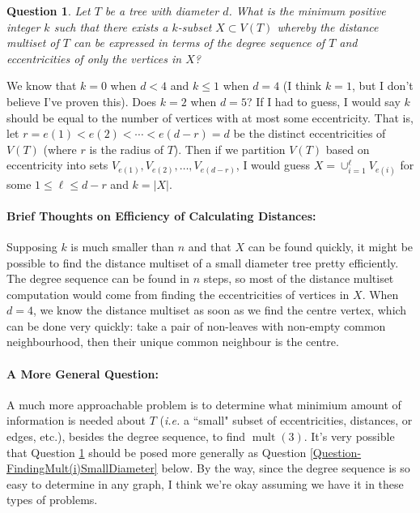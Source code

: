 \documentclass[12]{article}
\DeclareMathOperator{\mult}{mult}
\newtheorem{question}{Question}
\theoremstyle{definition}
\begin{document}
	\begin{question}\label{Question-FindingDistancesSmallDiameter}
		Let $T$ be a tree with diameter $d$.  What is the minimum positive integer $k$ such that there exists a $k$-subset $X \subset V(T)$ whereby the distance multiset of $T$ can be expressed in terms of the degree sequence of $T$ and eccentricities of only the vertices in $X$?
	\end{question}

	We know that $k=0$ when $d < 4$ and $k \leq 1$ when $d=4$ (I think $k=1$, but I don't believe I've proven this).  Does $k = 2$ when $d=5$?  If I had to guess, I would say $k$ should be equal to the number of vertices with at most some eccentricity.  That is, let $r=e(1) < e(2) < \cdots < e(d-r) = d$ be the distinct eccentricities of $V(T)$ (where $r$ is the radius of $T$).  Then if we partition $V(T)$ based on eccentricity into sets $V_{e(1)}, V_{e(2)}, \ldots, V_{e(d-r)}$, I would guess $X = \cup_{i=1}^\ell V_{e(i)}$ for some $1 \leq \ell \leq d-r$ and $k = |X|$.
	
	\paragraph{Brief Thoughts on Efficiency of Calculating Distances:} Supposing $k$ is much smaller than $n$ and that $X$ can be found quickly, it might be possible to find the distance multiset of a small diameter tree pretty efficiently.  The degree sequence can be found in $n$ steps, so most of the distance multiset computation would come from finding the eccentricities of vertices in $X$.  When $d=4$, we know the distance multiset as soon as we find the centre vertex, which can be done very quickly: take a pair of non-leaves with non-empty common neighbourhood, then their unique common neighbour is the centre.

	\paragraph{A More General Question:} A much more approachable problem is to determine what minimium amount of information is needed about $T$ (\textit{i.e.} a ``small" subset of eccentricities, distances, or edges, etc.), besides the degree sequence, to find $\mult(3)$.  It's very possible that Question \ref{Question-FindingDistancesSmallDiameter} should be posed more generally as Question \ref{Question-FindingMult(i)SmallDiameter} below.  By the way, since the degree sequence is so easy to determine in any graph, I think we're okay assuming we have it in these types of problems.
	
\end{document}
